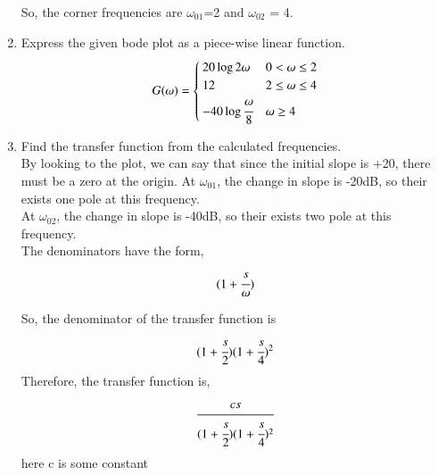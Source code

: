 \begin{enumerate}[label=\thesection.\arabic*.,ref=\thesection.\theenumi]
So, the corner frequencies are $\omega_{01}$=2 and $\omega_{02}$ = 4.\\


\item Express the given bode plot as a piece-wise linear function.
\\
\solution
\begin{align}
 G(\omega) = 
 \begin{cases} 
        20\log 2\omega & 0 < \omega \leq 2 \\
      12 & 2 \leq \omega \leq 4 \\
      -40\log\cfrac{\omega}{8} & \omega \geq 4\\
 \end{cases}
\end{align}


\item Find the transfer function from the calculated frequencies.
\\
\solution
By looking to the plot, we can say that since the initial slope is +20, there must be a zero at the origin.
At $\omega_{01}$, the change in slope is -20dB, so their exists one pole at this frequency.\\
At $\omega_{02}$, the change in slope is -40dB, so their exists two pole at this frequency.\\
The denominators have the form,
\begin{align*}
    (1 + \cfrac{s}{\omega})
\end{align*}

So, the denominator of the transfer function is 
\begin{align*}
    (1 + \cfrac{s}{2})(1 + \cfrac{s}{4})^2
\end{align*}
Therefore, the transfer function is,
\begin{align*}
    \cfrac{cs}{(1 + \cfrac{s}{2})(1 + \cfrac{s}{4})^2} 
\end{align*}
here c is some constant\\



\end{enumerate}
